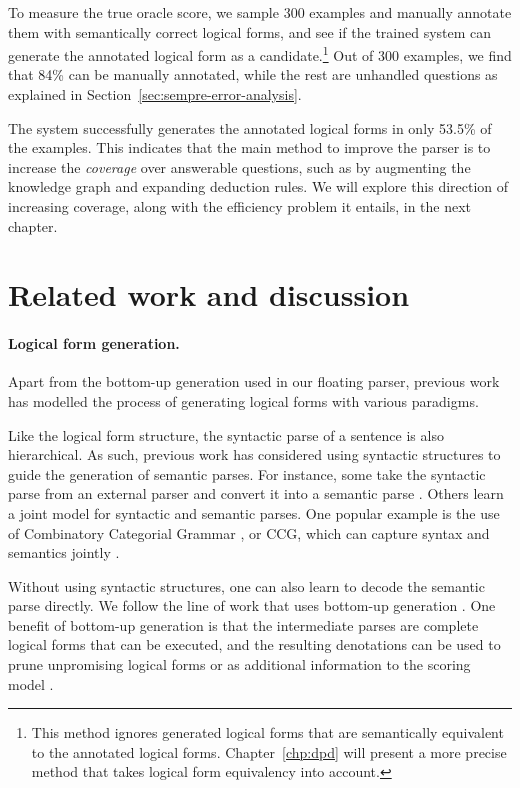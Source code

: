 To measure the true oracle score,
we sample 300 examples and manually annotate them
with semantically correct logical forms,
and see if the trained system can generate
the annotated logical form as a candidate.\footnote{
This method ignores generated logical forms
that are semantically
equivalent to the annotated logical forms.
Chapter~\ref{chp:dpd} will present
a more precise method that takes
logical form equivalency into account.
}
Out of 300 examples,
we find that 84\% can be manually annotated,
while the rest are unhandled questions
as explained in Section~\ref{sec:sempre-error-analysis}.

The system successfully generates the annotated
logical forms in only 53.5\% of the examples.
This indicates that the main method to improve the parser
is to increase the \emph{coverage} over answerable questions,
such as by augmenting the knowledge graph
and expanding deduction rules.
We will explore this direction of increasing coverage,
along with the efficiency problem it entails,
in the next chapter.

\section{Related work and discussion}

\paragraph{Logical form generation.}
Apart from the bottom-up generation used in our floating parser,
previous work has modelled the process of generating logical forms
with various paradigms.

Like the logical form structure,
the syntactic parse of a sentence is also hierarchical.
As such, previous work has considered using
syntactic structures to guide
the generation of semantic parses.
For instance, some take the syntactic parse
from an external parser and convert it into a semantic parse
\cite{poon2013gusp,reddy2016transforming}.
Others learn a joint model for syntactic and semantic parses.
One popular example is the use of
Combinatory Categorial Grammar
\cite{steedman1996surface,steedman00ccg}, or CCG,
which can capture syntax and semantics jointly
\cite{zettlemoyer05ccg,zettlemoyer07relaxed,kwiatkowski10ccg,kwiatkowski11lex}.

Without using syntactic structures,
one can also learn to decode the semantic parse directly.
We follow the line of work that uses
bottom-up generation
\cite{berant2013freebase,berant2014paraphrasing,berant2015agenda}.
One benefit of bottom-up generation is that
the intermediate parses are complete logical forms
that can be executed,
and the resulting denotations
can be used to prune unpromising logical forms
\cite{wang2018robust}
or as additional information
to the scoring model
\cite{guu2017bridging}.

